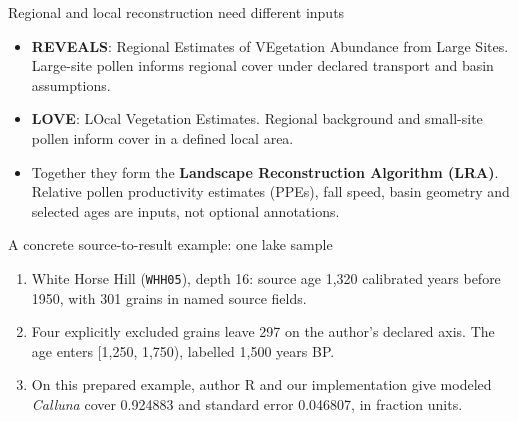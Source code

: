 \begin{frame}{Regional and local reconstruction need different inputs}
\begin{itemize}
\item \textbf{REVEALS}: Regional Estimates of VEgetation Abundance from Large Sites. Large-site pollen informs regional cover under declared transport and basin assumptions.
\item \textbf{LOVE}: LOcal Vegetation Estimates. Regional background and small-site pollen inform cover in a defined local area.
\item Together they form the \textbf{Landscape Reconstruction Algorithm (LRA)}. Relative pollen productivity estimates (PPEs), fall speed, basin geometry and selected ages are inputs, not optional annotations.
\end{itemize}
\end{frame}

\begin{frame}{A concrete source-to-result example: one lake sample}
\begin{enumerate}
\item White Horse Hill (\texttt{WHH05}), depth 16: source age 1,320 calibrated years before 1950, with 301 grains in named source fields.
\item Four explicitly excluded grains leave 297 on the author's declared axis. The age enters [1,250, 1,750), labelled 1,500 years BP.
\item On this prepared example, author R and our implementation give modeled \textit{Calluna} cover 0.924883 and standard error 0.046807, in fraction units.
\end{enumerate}
\end{frame}

